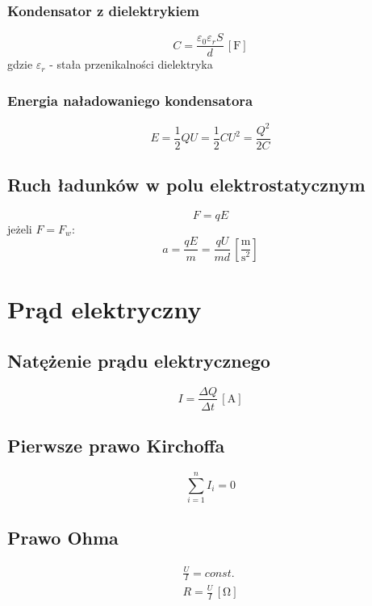 \documentclass{report}
\numberwithin{equation}{chapter}
\newcommand{\unit}[1]{\,\left[\mathrm{#1}\right]}
\begin{document}
      \subsection{Kondensator z dielektrykiem}
      \begin{equation}
        C= \frac{\varepsilon_0\varepsilon_rS}{d} \unit{F}
      \end{equation}
      gdzie $\varepsilon_r$ - stała przenikalności dielektryka
      \subsection{Energia naładowaniego kondensatora}
        \begin{equation}
          E = \frac{1}{2}QU = \frac{1}{2}CU^2 = \frac{Q^2}{2C}
        \end{equation}
    \section{Ruch ładunków w polu elektrostatycznym}
      \begin{equation}
        F = qE
      \end{equation}
      jeżeli $F = F_w$:
      \begin{equation}
        a = \frac{qE}{m} = \frac{qU}{md} \unit{\frac{m}{s^2}}
      \end{equation}

  \newpage
  \chapter{Prąd elektryczny}
    \section{Natężenie prądu elektrycznego}
      \begin{equation}
        I = \frac{\Delta Q}{\Delta t} \unit{A}
      \end{equation}
    \section{Pierwsze prawo Kirchoffa}
      \begin{equation}
        \sum_{i=1}^n I_i = 0
      \end{equation}
    \section{Prawo Ohma}
      \begin{gather}
        \frac{U}{I} = const.\\
        R = \frac{U}{I} \unit{\Omega}
      \end{gather}
\end{document}
